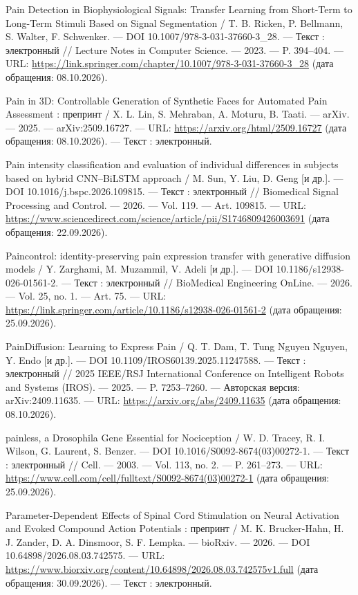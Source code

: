 \begin{list}{}{\setlength{\leftmargin}{10mm}\setlength{\labelwidth}{8mm}\setlength{\labelsep}{2mm}\setlength{\itemsep}{0pt}\setlength{\parsep}{0pt}\setlength{\topsep}{0pt}}
\item[219.] Pain Detection in Biophysiological Signals: Transfer Learning from Short-Term to Long-Term Stimuli Based on Signal Segmentation / T. B. Ricken, P. Bellmann, S. Walter, F. Schwenker. — DOI 10.1007/978-3-031-37660-3\_28. — Текст : электронный // Lecture Notes in Computer Science. — 2023. — P. 394–404. — URL: \url{https://link.springer.com/chapter/10.1007/978-3-031-37660-3\_28} (дата обращения: 08.10.2026).
\item[220.] Pain in 3D: Controllable Generation of Synthetic Faces for Automated Pain Assessment : препринт / X. L. Lin, S. Mehraban, A. Moturu, B. Taati. — arXiv. — 2025. — arXiv:2509.16727. — URL: \url{https://arxiv.org/html/2509.16727} (дата обращения: 08.10.2026). — Текст : электронный.
\item[221.] Pain intensity classification and evaluation of individual differences in subjects based on hybrid CNN–BiLSTM approach / M. Sun, Y. Liu, D. Geng [и др.]. — DOI 10.1016/j.bspc.2026.109815. — Текст : электронный // Biomedical Signal Processing and Control. — 2026. — Vol. 119. — Art. 109815. — URL: \url{https://www.sciencedirect.com/science/article/pii/S1746809426003691} (дата обращения: 22.09.2026).
\item[222.] Paincontrol: identity-preserving pain expression transfer with generative diffusion models / Y. Zarghami, M. Muzammil, V. Adeli [и др.]. — DOI 10.1186/s12938-026-01561-2. — Текст : электронный // BioMedical Engineering OnLine. — 2026. — Vol. 25, no. 1. — Art. 75. — URL: \url{https://link.springer.com/article/10.1186/s12938-026-01561-2} (дата обращения: 25.09.2026).
\item[223.] PainDiffusion: Learning to Express Pain / Q. T. Dam, T. Tung Nguyen Nguyen, Y. Endo [и др.]. — DOI 10.1109/IROS60139.2025.11247588. — Текст : электронный // 2025 IEEE/RSJ International Conference on Intelligent Robots and Systems (IROS). — 2025. — P. 7253–7260. — Авторская версия: arXiv:2409.11635. — URL: \url{https://arxiv.org/abs/2409.11635} (дата обращения: 08.10.2026).
\item[224.] painless, a Drosophila Gene Essential for Nociception / W. D. Tracey, R. I. Wilson, G. Laurent, S. Benzer. — DOI 10.1016/S0092-8674(03)00272-1. — Текст : электронный // Cell. — 2003. — Vol. 113, no. 2. — P. 261–273. — URL: \url{https://www.cell.com/cell/fulltext/S0092-8674(03)00272-1} (дата обращения: 25.09.2026).
\item[225.] Parameter-Dependent Effects of Spinal Cord Stimulation on Neural Activation and Evoked Compound Action Potentials : препринт / M. K. Brucker-Hahn, H. J. Zander, D. A. Dinsmoor, S. F. Lempka. — bioRxiv. — 2026. — DOI 10.64898/2026.08.03.742575. — URL: \url{https://www.biorxiv.org/content/10.64898/2026.08.03.742575v1.full} (дата обращения: 30.09.2026). — Текст : электронный.

\end{list}
